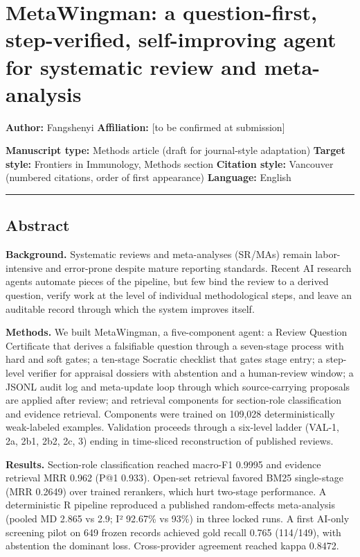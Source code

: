 \documentclass[
]{article}
\author{}
\date{}
\begin{document}
\section{MetaWingman: a question-first, step-verified, self-improving
agent for systematic review and
meta-analysis}\label{metawingman-a-question-first-step-verified-self-improving-agent-for-systematic-review-and-meta-analysis}

\textbf{Author:} Fangshenyi \textbf{Affiliation:} {[}to be confirmed at
submission{]}

\textbf{Manuscript type:} Methods article (draft for journal-style
adaptation) \textbf{Target style:} Frontiers in Immunology, Methods
section \textbf{Citation style:} Vancouver (numbered citations, order of
first appearance) \textbf{Language:} English

\begin{center}\rule{0.5\linewidth}{0.5pt}\end{center}

\subsection{Abstract}\label{abstract}

\textbf{Background.} Systematic reviews and meta-analyses (SR/MAs)
remain labor-intensive and error-prone despite mature reporting
standards. Recent AI research agents automate pieces of the pipeline,
but few bind the review to a derived question, verify work at the level
of individual methodological steps, and leave an auditable record
through which the system improves itself.

\textbf{Methods.} We built MetaWingman, a five-component agent: a Review
Question Certificate that derives a falsifiable question through a
seven-stage process with hard and soft gates; a ten-stage Socratic
checklist that gates stage entry; a step-level verifier for appraisal
dossiers with abstention and a human-review window; a JSONL audit log
and meta-update loop through which source-carrying proposals are applied
after review; and retrieval components for section-role classification
and evidence retrieval. Components were trained on 109,028
deterministically weak-labeled examples. Validation proceeds through a
six-level ladder (VAL-1, 2a, 2b1, 2b2, 2c, 3) ending in time-sliced
reconstruction of published reviews.

\textbf{Results.} Section-role classification reached macro-F1 0.9995
and evidence retrieval MRR 0.962 (P@1 0.933). Open-set retrieval favored
BM25 single-stage (MRR 0.2649) over trained rerankers, which hurt
two-stage performance. A deterministic R pipeline reproduced a published
random-effects meta-analysis (pooled MD 2.865 vs 2.9; I² 92.67\% vs
93\%) in three locked runs. A first AI-only screening pilot on 649
frozen records achieved gold recall 0.765 (114/149), with abstention the
dominant loss. Cross-provider agreement reached kappa 0.8472.
\end{document}
